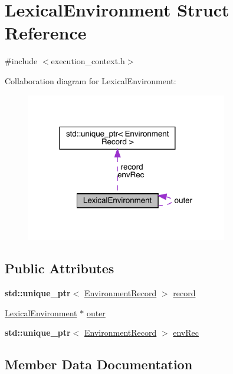 \hypertarget{struct_lexical_environment}{}\section{Lexical\+Environment Struct Reference}
\label{struct_lexical_environment}


{\ttfamily \#include $<$execution\+\_\+context.\+h$>$}



Collaboration diagram for Lexical\+Environment\+:
\nopagebreak
\begin{figure}[H]
\begin{center}
\leavevmode
\includegraphics[width=249pt]{struct_lexical_environment__coll__graph}
\end{center}
\end{figure}
\subsection*{Public Attributes}
\begin{DoxyCompactItemize}
\item 
\textbf{ std\+::unique\+\_\+ptr}$<$ \hyperlink{struct_environment_record}{Environment\+Record} $>$ \hyperlink{struct_lexical_environment_a8cbbf5a6ba52bd6bc9d18a1405a27f93}{record}
\item 
\hyperlink{struct_lexical_environment}{Lexical\+Environment} $\ast$ \hyperlink{struct_lexical_environment_a355543b6ca29aacdde230fdbc97cc23e}{outer}
\item 
\textbf{ std\+::unique\+\_\+ptr}$<$ \hyperlink{struct_environment_record}{Environment\+Record} $>$ \hyperlink{struct_lexical_environment_a87416f683041c1888f00d7dfe1bca2dc}{env\+Rec}
\end{DoxyCompactItemize}


\subsection{Member Data Documentation}
\mbox{\label{struct_lexical_environment_a87416f683041c1888f00d7dfe1bca2dc}} 
